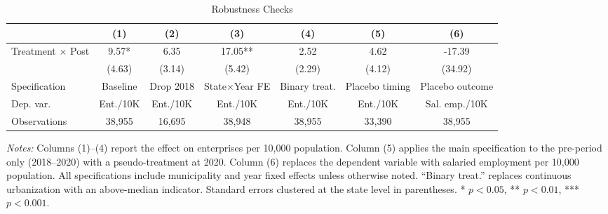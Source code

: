 \begin{table}[htbp]
\centering
\caption{Robustness Checks}
\label{tab:robust}
\small
\begin{adjustbox}{max width=\textwidth}
\begin{tabular}{lcccccc}
\toprule
 & (1) & (2) & (3) & (4) & (5) & (6) \\
\midrule
Treatment $\times$ Post & 9.57* & 6.35 & 17.05** & 2.52 & 4.62 & -17.39 \\
 & (4.63) & (3.14) & (5.42) & (2.29) & (4.12) & (34.92) \\
\midrule
Specification & Baseline & Drop 2018 & State$\times$Year FE & Binary treat. & Placebo timing & Placebo outcome \\
Dep. var. & Ent./10K & Ent./10K & Ent./10K & Ent./10K & Ent./10K & Sal. emp./10K \\
Observations & 38,955 & 16,695 & 38,948 & 38,955 & 33,390 & 38,955 \\
\bottomrule
\end{tabular}
\end{adjustbox}
\begin{tablenotes}
\item \textit{Notes:} Columns (1)--(4) report the effect on enterprises per 10,000 population. Column (5) applies the main specification to the pre-period only (2018--2020) with a pseudo-treatment at 2020. Column (6) replaces the dependent variable with salaried employment per 10,000 population. All specifications include municipality and year fixed effects unless otherwise noted. ``Binary treat.'' replaces continuous urbanization with an above-median indicator. Standard errors clustered at the state level in parentheses. * $p < 0.05$, ** $p < 0.01$, *** $p < 0.001$.
\end{tablenotes}
\end{table}
